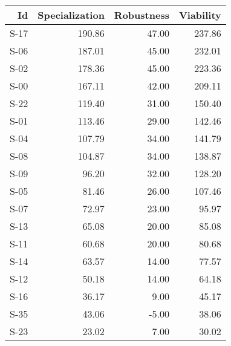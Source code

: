 \begin{tabular}{ | r | r | r | r | }
    \hline
                    Id  &  Specialization  &      Robustness  &       Viability  \\
    \hline
    \hline
                  S-17  &          190.86  &           47.00  &          237.86  \\
    \hline
                  S-06  &          187.01  &           45.00  &          232.01  \\
    \hline
                  S-02  &          178.36  &           45.00  &          223.36  \\
    \hline
                  S-00  &          167.11  &           42.00  &          209.11  \\
    \hline
                  S-22  &          119.40  &           31.00  &          150.40  \\
    \hline
                  S-01  &          113.46  &           29.00  &          142.46  \\
    \hline
                  S-04  &          107.79  &           34.00  &          141.79  \\
    \hline
                  S-08  &          104.87  &           34.00  &          138.87  \\
    \hline
                  S-09  &           96.20  &           32.00  &          128.20  \\
    \hline
                  S-05  &           81.46  &           26.00  &          107.46  \\
    \hline
                  S-07  &           72.97  &           23.00  &           95.97  \\
    \hline
                  S-13  &           65.08  &           20.00  &           85.08  \\
    \hline
                  S-11  &           60.68  &           20.00  &           80.68  \\
    \hline
                  S-14  &           63.57  &           14.00  &           77.57  \\
    \hline
                  S-12  &           50.18  &           14.00  &           64.18  \\
    \hline
                  S-16  &           36.17  &            9.00  &           45.17  \\
    \hline
                  S-35  &           43.06  &           -5.00  &           38.06  \\
    \hline
                  S-23  &           23.02  &            7.00  &           30.02  \\

\end{tabular}
